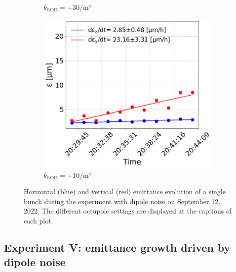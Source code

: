 \begin{figure}[htp]
\begin{subfigure}{.4\textwidth}
            \caption{$k_\mathrm{LOD}=+30  \mathrm{/m^{4}}$}
    \end{subfigure}
    \begin{subfigure}{.4\textwidth}
        \centering
        \includegraphics[width=.95\linewidth]{images/app_c/cc_md_12sep22_coast11.png}  
        \caption{$k_\mathrm{LOD}=+10 \mathrm{/m^{4}}$}
    \end{subfigure}
    \caption{Horizontal (blue) and vertical (red) emittance evolution of a single bunch during the experiment with dipole noise on September 12, 2022.  The different octupole settings are displayed at the captions of each plot.}
    \label{fig:cc_md_12sep2022_overview_plots_klod_scan}
 \end{figure}
 
\newpage
 \subsection{Experiment V: emittance growth driven by dipole noise}\label{subsec:exp5_coast_md_damper_2022_emittance}


